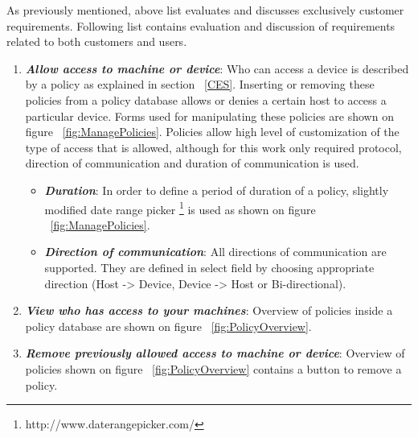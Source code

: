 As previously mentioned, above list evaluates and discusses exclusively customer requirements. Following list contains evaluation and discussion of requirements related to both customers and users. 

\begin{enumerate}
	\setlength{\itemsep}{1pt}
	\item \textbf{\textit{Allow access to machine or device}}: Who can access a device is described by a policy as explained in section ~\ref{CES}. Inserting or removing these policies from a policy database allows or denies a certain host to access a particular device. Forms used for manipulating these policies are shown on figure ~\ref{fig:ManagePolicies}. Policies allow high level of customization of the type of access that is allowed, although for this work only required protocol, direction of communication and duration of communication is used.
		\begin{itemize}
			\item \textbf{\textit{Duration}}: In order to define a period of duration of a policy, slightly modified date range picker \footnote{http://www.daterangepicker.com/} is used as shown on figure ~\ref{fig:ManagePolicies}.

			\item \textbf{\textit{Direction of communication}}: All directions of communication are supported. They are defined in select field by choosing appropriate direction (Host -> Device, Device -> Host or Bi-directional).
		\end{itemize}

	\item \textbf{\textit{View who has access to your machines}}: Overview of policies inside a policy database are shown on figure ~\ref{fig:PolicyOverview}.

	\item \textbf{\textit{Remove previously allowed access to machine or device}}: Overview of policies shown on figure ~\ref{fig:PolicyOverview} contains a button to remove a policy.
\end{enumerate}